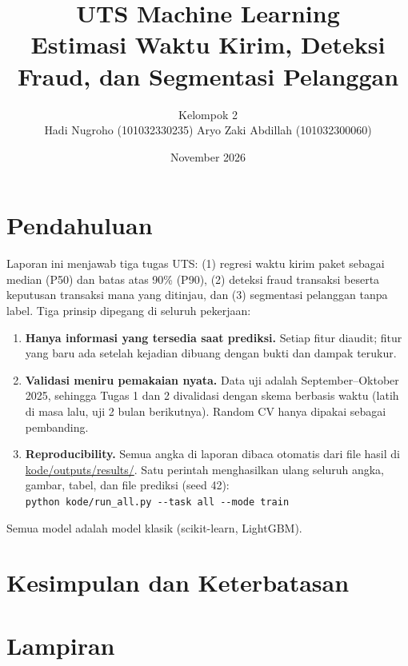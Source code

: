\documentclass[11pt,a4paper]{article}
\title{UTS Machine Learning\\\large Estimasi Waktu Kirim, Deteksi Fraud, dan Segmentasi Pelanggan}
\author{Kelompok 2 \\ Hadi Nugroho (101032330235) \quad Aryo Zaki Abdillah (101032300060)}
\date{November 2026}
\begin{document}
\maketitle

\section{Pendahuluan}
Laporan ini menjawab tiga tugas UTS: (1) regresi waktu kirim paket sebagai median (P50) dan batas atas 90\% (P90),
(2) deteksi fraud transaksi beserta keputusan transaksi mana yang ditinjau, dan (3) segmentasi pelanggan tanpa label.
Tiga prinsip dipegang di seluruh pekerjaan:
\begin{enumerate}
  \item \textbf{Hanya informasi yang tersedia saat prediksi.} Setiap fitur diaudit; fitur yang baru ada setelah kejadian dibuang dengan bukti dan dampak terukur.
  \item \textbf{Validasi meniru pemakaian nyata.} Data uji adalah September--Oktober 2025, sehingga Tugas 1 dan 2 divalidasi dengan skema berbasis waktu (latih di masa lalu, uji 2 bulan berikutnya). Random CV hanya dipakai sebagai pembanding.
  \item \textbf{Reproducibility.} Semua angka di laporan dibaca otomatis dari file hasil di \url{kode/outputs/results/}. Satu perintah menghasilkan ulang seluruh angka, gambar, tabel, dan file prediksi (seed 42):\\ \texttt{python kode/run\_all.py -{}-task all -{}-mode train}
\end{enumerate}
Semua model adalah model klasik (scikit-learn, LightGBM).






\section{Kesimpulan dan Keterbatasan}


\appendix
\section{Lampiran}

\end{document}
